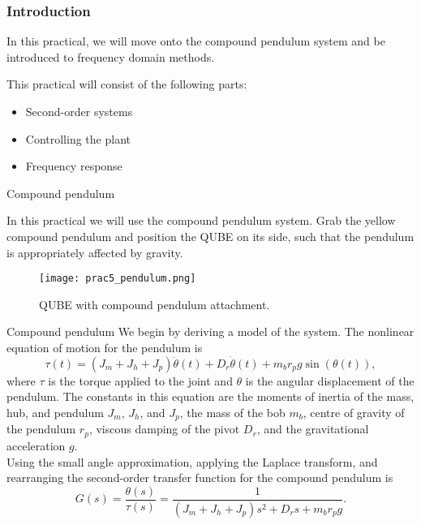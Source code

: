 \documentclass[9pt]{beamer-control}
\begin{document}

\begin{frame}
\frametitle{Introduction}
In this practical, we will move onto the compound pendulum system and be introduced to frequency domain methods.

\vfill

This practical will consist of the following parts:
\begin{itemize}
\item Second-order systems
\item Controlling the plant
\item Frequency response
\end{itemize}
\end{frame}


\begin{frame}{Compound pendulum}

In this practical we will use the compound pendulum system.
Grab the yellow compound pendulum and position the QUBE on its side, such that the pendulum is appropriately affected by gravity.\\

\begin{figure}
	\centering
	\texttt{[image: prac5\_pendulum.png]}
	\caption{QUBE with compound pendulum attachment.}
\end{figure}

\end{frame}


\begin{frame}{Compound pendulum}
	We begin by deriving a model of the system.
The nonlinear equation of motion for the pendulum is 
\[\tau(t) = (J_m+J_h+J_p) \ddot{\theta}(t) + D_r \dot{\theta}(t) + m_b r_p g \sin \left(\theta (t)\right), \]
where $\tau$ is the torque applied to the joint and $\theta$ is the angular displacement of the pendulum. The constants in this equation are the moments of inertia of the mass, hub, and pendulum $J_m$, $J_h$, and $J_p$, the mass of the bob $m_b$, centre of gravity of the pendulum $r_p$, viscous damping of the pivot $D_r$, and the gravitational acceleration $g$.\\

Using the small angle approximation, applying the Laplace transform, and rearranging the second-order transfer function for the compound pendulum is 
\[ G(s) = \frac{\theta(s)}{\tau (s)} = \frac{1}{(J_m+J_h+J_p)s^2 + D_r s + m_b r_p g } .\]

\end{frame}
\end{document}
